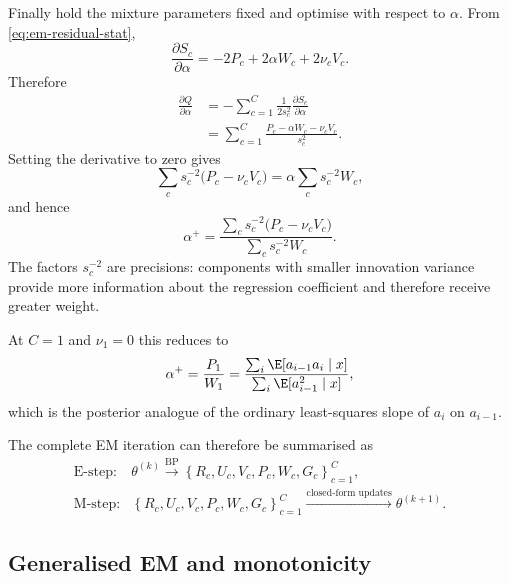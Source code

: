 Finally hold the mixture parameters fixed and optimise with respect to
$\alpha$. From \eqref{eq:em-residual-stat},
\begin{equation}
  \frac{\partial S_c}{\partial\alpha}
  =
  -2P_c
  +2\alpha W_c
  +2\nu_cV_c.
\end{equation}
Therefore
\begin{align}
  \frac{\partial Q}{\partial\alpha}
  &=
  -\sum_{c=1}^{C}
  \frac{1}{2s_c^2}
  \frac{\partial S_c}{\partial\alpha}
  \nonumber\\
  &=
  \sum_{c=1}^{C}
  \frac{
    P_c-\alpha W_c-\nu_cV_c
  }{s_c^2}.
  \label{eq:em-alpha-derivative}
\end{align}
Setting the derivative to zero gives
\begin{equation}
  \sum_c
  s_c^{-2}
  \big(
    P_c-\nu_cV_c
  \big)
  =
  \alpha
  \sum_c
  s_c^{-2}W_c,
\end{equation}
and hence
\begin{equation}
  \boxed{
  \alpha^{+}
  =
  \frac{
    \displaystyle
    \sum_c
    s_c^{-2}
    \big(
      P_c-\nu_cV_c
    \big)
  }{
    \displaystyle
    \sum_c
    s_c^{-2}W_c
  }.
  }
  \label{eq:em-mstep-alpha}
\end{equation}
The factors $s_c^{-2}$ are precisions: components with smaller innovation
variance provide more information about the regression coefficient and
therefore receive greater weight.

At $C=1$ and $\nu_1=0$ this reduces to
\begin{equation}
  \alpha^{+}
  =
  \frac{P_1}{W_1}
  =
  \frac{
    \sum_i
    \E[a_{i-1}a_i\mid x]
  }{
    \sum_i
    \E[a_{i-1}^2\mid x]
  },
\end{equation}
which is the posterior analogue of the ordinary least-squares slope of $a_i$
on $a_{i-1}$.

The complete EM iteration can therefore be summarised as
\begin{equation}
  \boxed{
  \begin{array}{ll}
  \text{E-step:}
  &
  \theta^{(k)}
  \xrightarrow{\mathrm{BP}}
  \left\{
    R_c,U_c,V_c,P_c,W_c,G_c
  \right\}_{c=1}^{C},
  \\[2mm]
  \text{M-step:}
  &
  \left\{
    R_c,U_c,V_c,P_c,W_c,G_c
  \right\}_{c=1}^{C}
  \xrightarrow{\text{closed-form updates}}
  \theta^{(k+1)}.
  \end{array}
  }
  \label{eq:em-summary}
\end{equation}

\subsection{Generalised EM and monotonicity}

